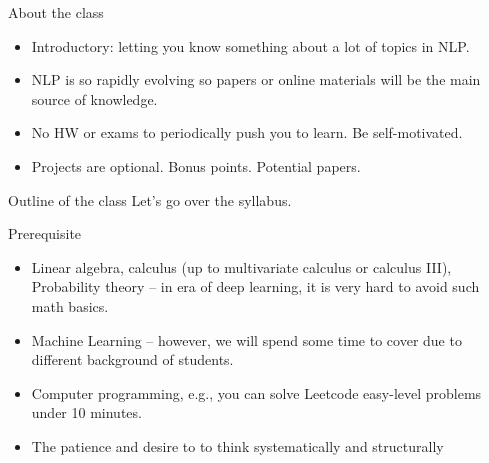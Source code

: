 \documentclass[11pt,handout]{beamer}
\begin{document}
\begin{frame}{About the class}
  \begin{itemize}
   \item Introductory: letting you know something about a lot of topics in NLP.
   \item NLP is so rapidly evolving so papers or online materials will be the main source of knowledge. 
   \item No HW or exams to periodically push you to learn. Be self-motivated. 
   \item Projects are optional. Bonus points. Potential papers. 
  \end{itemize}
 \end{frame}

\begin{frame}{Outline of the class}
Let's go over the syllabus. 
\end{frame}

\begin{frame}{Prerequisite}
\begin{itemize}
\item Linear algebra, calculus (up to multivariate calculus or calculus III), Probability theory -- in era of deep learning, it is very hard to avoid such math basics.
\item Machine Learning -- however, we will spend some time to cover due to different background of students. 
\item Computer programming, e.g., you can solve Leetcode easy-level problems under 10 minutes. 
\item The patience and desire to to think systematically and structurally 
\end{itemize}
\end{frame}


\end{document}
